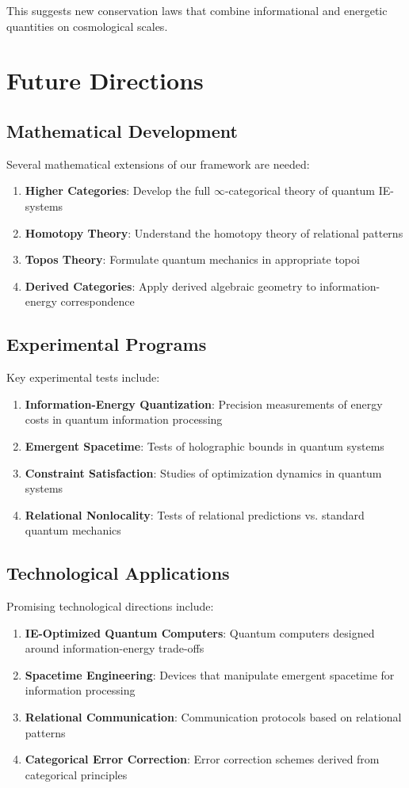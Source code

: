 \documentclass[12pt,a4paper]{article}
\begin{document}
This suggests new conservation laws that combine informational and energetic quantities on cosmological scales.

\section{Future Directions}

\subsection{Mathematical Development}

Several mathematical extensions of our framework are needed:
\begin{enumerate}
\item \textbf{Higher Categories}: Develop the full $\infty$-categorical theory of quantum IE-systems
\item \textbf{Homotopy Theory}: Understand the homotopy theory of relational patterns
\item \textbf{Topos Theory}: Formulate quantum mechanics in appropriate topoi
\item \textbf{Derived Categories}: Apply derived algebraic geometry to information-energy correspondence
\end{enumerate}

\subsection{Experimental Programs}

Key experimental tests include:
\begin{enumerate}
\item \textbf{Information-Energy Quantization}: Precision measurements of energy costs in quantum information processing
\item \textbf{Emergent Spacetime}: Tests of holographic bounds in quantum systems
\item \textbf{Constraint Satisfaction}: Studies of optimization dynamics in quantum systems
\item \textbf{Relational Nonlocality}: Tests of relational predictions vs. standard quantum mechanics
\end{enumerate}

\subsection{Technological Applications}

Promising technological directions include:
\begin{enumerate}
\item \textbf{IE-Optimized Quantum Computers}: Quantum computers designed around information-energy trade-offs
\item \textbf{Spacetime Engineering}: Devices that manipulate emergent spacetime for information processing
\item \textbf{Relational Communication}: Communication protocols based on relational patterns
\item \textbf{Categorical Error Correction}: Error correction schemes derived from categorical principles
\end{enumerate}
\end{document}
